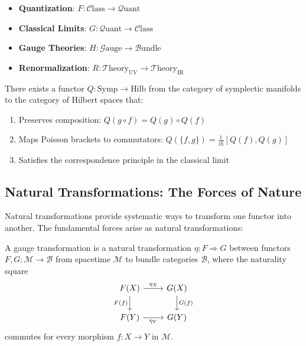 \begin{itemize}[leftmargin=*]
\item \textbf{Quantization}: $F: \mathcal{C}\text{lass} \to \mathcal{Q}\text{uant}$
\item \textbf{Classical Limits}: $G: \mathcal{Q}\text{uant} \to \mathcal{C}\text{lass}$
\item \textbf{Gauge Theories}: $H: \mathcal{G}\text{auge} \to \mathcal{B}\text{undle}$
\item \textbf{Renormalization}: $R: \mathcal{T}\text{heory}_{\text{UV}} \to \mathcal{T}\text{heory}_{\text{IR}}$
\end{itemize}

\begin{theorem}
There exists a functor $Q: \text{Symp} \to \text{Hilb}$ from the category of symplectic manifolds to the category of Hilbert spaces that:
\begin{enumerate}
\item Preserves composition: $Q(g \circ f) = Q(g) \circ Q(f)$
\item Maps Poisson brackets to commutators: $Q(\{f,g\}) = \frac{1}{i\hbar}[Q(f), Q(g)]$
\item Satisfies the correspondence principle in the classical limit
\end{enumerate}
\end{theorem}

\subsection{Natural Transformations: The Forces of Nature}

Natural transformations provide systematic ways to transform one functor into another. The fundamental forces arise as natural transformations:

\begin{definition}
A gauge transformation is a natural transformation $\eta: F \Rightarrow G$ between functors $F, G: \mathcal{M} \to \mathcal{B}$ from spacetime $\mathcal{M}$ to bundle categories $\mathcal{B}$, where the naturality square
\[
\begin{tikzcd}
F(X) \arrow[r, "\eta_X"] \arrow[d, "F(f)"'] & G(X) \arrow[d, "G(f)"] \\
F(Y) \arrow[r, "\eta_Y"'] & G(Y)
\end{tikzcd}
\]
commutes for every morphism $f: X \to Y$ in $\mathcal{M}$.
\end{definition}


